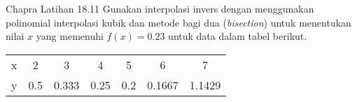 \begin{soal}{Chapra Latihan 18.11}
Gunakan interpolasi invers dengan menggunakan polinomial interpolasi kubik dan
metode bagi dua (\textit{bisection}) untuk menentukan nilai $x$ yang memenuhi
$f(x) = 0.23$ untuk data dalam tabel berikut.

{\centering
\begin{tabular}{|c|cccccc|}
\hline
x & 2   &   3   & 4    & 5 & 6 & 7 \\
y & 0.5 & 0.333 & 0.25 & 0.2 & 0.1667 & 1.1429 \\
\hline
\end{tabular}
\par}
\end{soal}